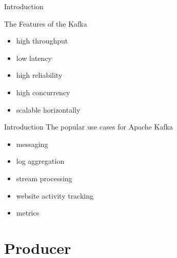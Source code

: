 \begin{frame}[plain,t]{Introduction} %
    \vspace{2ex}
    
    The Features of the Kafka
     \vspace{2ex}
    \begin{itemize}
        \item high throughput
        \item low latency
        \item high reliability
        \item high concurrency
        \item scalable horizontally
    \end{itemize}


    
\end{frame}
\begin{frame}[plain,t]{Introduction} %
    \vspace{2ex}
The popular use cases for Apache Kafka
 \vspace{2ex}
     \begin{itemize}
        \item messaging
        \item log aggregation
        \item stream processing
        \item website activity tracking
        \item metrics
    \end{itemize}
    
    
    
\end{frame}


\section{Producer}


